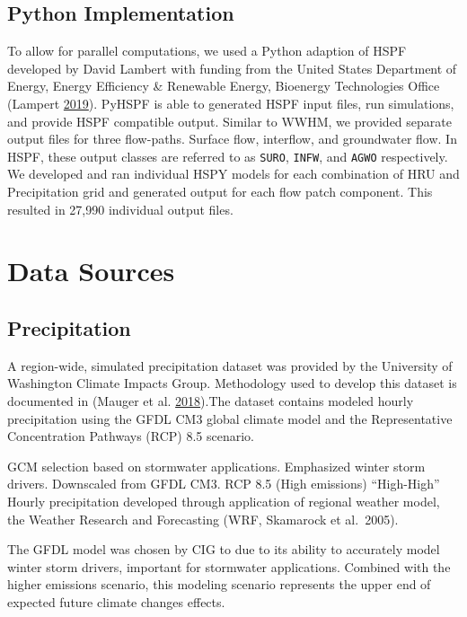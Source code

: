 \documentclass[
]{report}
\begin{document}
\hypertarget{python-implementation}{%
\subsection{Python Implementation}\label{python-implementation}}

To allow for parallel computations, we used a Python adaption of HSPF developed by David Lambert with funding from the United States Department of Energy, Energy Efficiency \& Renewable Energy, Bioenergy Technologies Office (Lampert \protect\hyperlink{ref-Lampert2019}{2019}). PyHSPF is able to generated HSPF input files, run simulations, and provide HSPF compatible output. Similar to WWHM, we provided separate output files for three flow-paths. Surface flow, interflow, and groundwater flow. In HSPF, these output classes are referred to as \texttt{SURO}, \texttt{INFW}, and \texttt{AGWO} respectively. We developed and ran individual HSPY models for each combination of HRU and Precipitation grid and generated output for each flow patch component. This resulted in 27,990 individual output files.

\hypertarget{data-sources}{%
\section{Data Sources}\label{data-sources}}

\hypertarget{precipitation}{%
\subsection{Precipitation}\label{precipitation}}

A region-wide, simulated precipitation dataset was provided by the University of Washington Climate Impacts Group. Methodology used to develop this dataset is documented in (Mauger et al. \protect\hyperlink{ref-Jr2018}{2018}).The dataset contains modeled hourly precipitation using the GFDL CM3 global climate model and the Representative Concentration Pathways (RCP) 8.5 scenario.

GCM selection based on stormwater applications. Emphasized winter storm drivers.
Downscaled from GFDL CM3. RCP 8.5 (High emissions) ``High-High''
Hourly precipitation developed through application of regional weather model, the Weather Research and Forecasting (WRF, Skamarock et al.~2005).

The GFDL model was chosen by CIG to due to its ability to accurately model winter storm drivers, important for stormwater applications. Combined with the higher emissions scenario, this modeling scenario represents the upper end of expected future climate changes effects.
\end{document}
